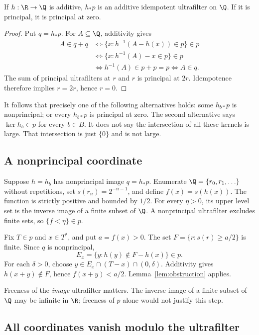 \documentclass[11pt]{article}
\begin{document}
\begin{lemma}\label{lem:push}
If $h:\R\to\Q$ is additive, $h_*p$ is an additive idempotent
ultrafilter on $\Q$. If it is principal, it is principal at zero.
\end{lemma}
\begin{proof}
Put $q=h_*p$. For $A\subseteq\Q$, additivity gives
\begin{align*}
 A\in q+q
 &\Longleftrightarrow
 \{x:h^{-1}(A-h(x))\in p\}\in p\\
 &\Longleftrightarrow
 \{x:h^{-1}(A)-x\in p\}\in p\\
 &\Longleftrightarrow h^{-1}(A)\in p+p=p
 \Longleftrightarrow A\in q.
\end{align*}
The sum of principal ultrafilters at $r$ and $r$ is principal at $2r$.
Idempotence therefore implies $r=2r$, hence $r=0$.
\end{proof}

It follows that precisely one of the following alternatives holds:
some $h_{b*}p$ is nonprincipal; or every $h_{b*}p$ is principal at zero.
The second alternative says $\ker h_b\in p$ for every $b\in B$. It does
not say the intersection of all these kernels is large. That intersection
is just $\{0\}$ and is not large.

\subsection{A nonprincipal coordinate}

Suppose $h=h_b$ has nonprincipal image $q=h_*p$. Enumerate
$\Q=\{r_0,r_1,\ldots\}$ without repetitions, set
$s(r_n)=2^{-n-1}$, and define $f(x)=s(h(x))$.
The function is strictly positive and bounded by $1/2$. For every
$\eta>0$, its upper level set is the inverse image of a finite subset
of $\Q$. A nonprincipal ultrafilter excludes finite sets, so
$\{f<\eta\}\in p$.

Fix $T\in p$ and $x\in T^*$, and put $a=f(x)>0$. The set
$F=\{r:s(r)\ge a/2\}$ is finite. Since $q$ is nonprincipal,
\[
 E_x=\{y:h(y)\notin F-h(x)\}\in p.
\]
For each $\delta>0$, choose
$y\in E_x\cap(T-x)\cap(0,\delta)$. Additivity gives
$h(x+y)\notin F$, hence $f(x+y)<a/2$. Lemma~\ref{lem:obstruction}
applies.

Freeness of the \emph{image} ultrafilter matters. The inverse image of a
finite subset of $\Q$ may be infinite in $\R$; freeness of $p$ alone
would not justify this step.

\subsection{All coordinates vanish modulo the ultrafilter}
\end{document}
